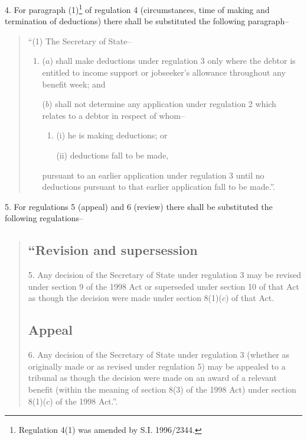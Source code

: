 \documentclass[12pt,a4paper]{article}
\begin{document}
\medskip

4.  For paragraph (1)\footnote{\frenchspacing Regulation 4(1) was amended by S.I. 1996/2344.} of regulation 4 (circumstances, time of making and termination of deductions) there shall be substituted the following paragraph–
\begin{quotation}
“(1) The Secretary of State–
\begin{enumerate}\item[]
($a$) shall make deductions under regulation 3 only where the debtor is entitled to income support or jobseeker’s allowance throughout any benefit week; and

($b$) shall not determine any application under regulation 2 which relates to a debtor in respect of whom–
\begin{enumerate}\item[]
(i) he is making deductions; or

(ii) deductions fall to be made,
\end{enumerate}
pursuant to an earlier application under regulation 3 until no deductions pursuant to that earlier application fall to be made.”.
\end{enumerate}
\end{quotation}

\medskip

5.  For regulations 5 (appeal) and 6 (review) there shall be substituted the following regulations–
\begin{quotation}
\subsection*{“Revision and supersession}

5.  Any decision of the Secretary of State under regulation 3 may be revised under section 9 of the 1998 Act or superseded under section 10 of that Act as though the decision were made under section 8(1)($c$)  of that Act.

\subsection*{Appeal}

6.  Any decision of the Secretary of State under regulation 3 (whether as originally made or as revised under regulation 5) may be appealed to a tribunal as though the decision were made on an award of a relevant benefit (within the meaning of section 8(3) of the 1998 Act) under section 8(1)($c$)  of the 1998 Act.”.
\end{quotation}
\end{document}
